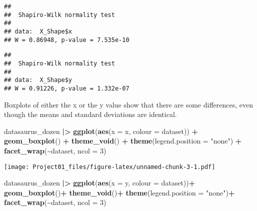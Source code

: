 \documentclass[
]{article}
\newenvironment{Shaded}{\begin{snugshade}}{\end{snugshade}}
\newcommand{\AttributeTok}[1]{\textcolor[rgb]{0.13,0.29,0.53}{#1}}
\newcommand{\DecValTok}[1]{\textcolor[rgb]{0.00,0.00,0.81}{#1}}
\newcommand{\FunctionTok}[1]{\textcolor[rgb]{0.13,0.29,0.53}{\textbf{#1}}}
\newcommand{\NormalTok}[1]{#1}
\newcommand{\SpecialCharTok}[1]{\textcolor[rgb]{0.81,0.36,0.00}{\textbf{#1}}}
\newcommand{\StringTok}[1]{\textcolor[rgb]{0.31,0.60,0.02}{#1}}
\begin{document}
\begin{verbatim}
## 
##  Shapiro-Wilk normality test
## 
## data:  X_Shape$x
## W = 0.86948, p-value = 7.535e-10
\end{verbatim}

\begin{Shaded}
\end{Shaded}

\begin{verbatim}
## 
##  Shapiro-Wilk normality test
## 
## data:  X_Shape$y
## W = 0.91226, p-value = 1.332e-07
\end{verbatim}

Boxplots of either the x or the y value show that there are some
differences, even though the means and standard deviations are
identical.

\begin{Shaded}
\begin{Highlighting}[]
\NormalTok{datasaurus\_dozen }\SpecialCharTok{|\textgreater{}}
  \FunctionTok{ggplot}\NormalTok{(}\FunctionTok{aes}\NormalTok{(}\AttributeTok{x =}\NormalTok{ x, }\AttributeTok{colour =}\NormalTok{ dataset)) }\SpecialCharTok{+}
    \FunctionTok{geom\_boxplot}\NormalTok{() }\SpecialCharTok{+}
    \FunctionTok{theme\_void}\NormalTok{() }\SpecialCharTok{+}
    \FunctionTok{theme}\NormalTok{(}\AttributeTok{legend.position =} \StringTok{"none"}\NormalTok{) }\SpecialCharTok{+}
    \FunctionTok{facet\_wrap}\NormalTok{(}\SpecialCharTok{\textasciitilde{}}\NormalTok{dataset, }\AttributeTok{ncol =} \DecValTok{3}\NormalTok{)}
\end{Highlighting}
\end{Shaded}

\texttt{[image: Project01\_files/figure-latex/unnamed-chunk-3-1.pdf]}

\begin{Shaded}
\begin{Highlighting}[]
\NormalTok{datasaurus\_dozen }\SpecialCharTok{|\textgreater{}}
  \FunctionTok{ggplot}\NormalTok{(}\FunctionTok{aes}\NormalTok{(}\AttributeTok{x =}\NormalTok{ y, }\AttributeTok{colour =}\NormalTok{ dataset))}\SpecialCharTok{+}
    \FunctionTok{geom\_boxplot}\NormalTok{()}\SpecialCharTok{+}
    \FunctionTok{theme\_void}\NormalTok{()}\SpecialCharTok{+}
    \FunctionTok{theme}\NormalTok{(}\AttributeTok{legend.position =} \StringTok{"none"}\NormalTok{)}\SpecialCharTok{+}
    \FunctionTok{facet\_wrap}\NormalTok{(}\SpecialCharTok{\textasciitilde{}}\NormalTok{dataset, }\AttributeTok{ncol =} \DecValTok{3}\NormalTok{)}
\end{Highlighting}
\end{Shaded}
\end{document}
